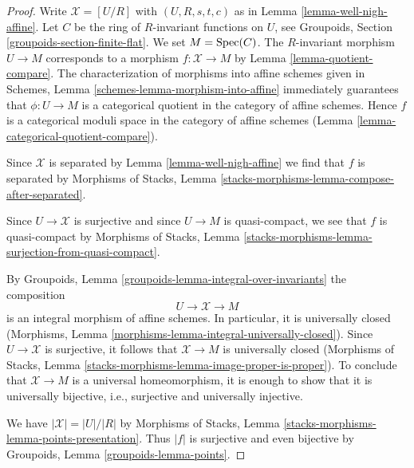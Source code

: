\begin{proof}
Write $\mathcal{X} = [U/R]$ with $(U, R, s, t, c)$ as in
Lemma \ref{lemma-well-nigh-affine}. Let $C$ be the ring of
$R$-invariant functions on $U$, see
Groupoids, Section \ref{groupoids-section-finite-flat}.
We set $M = \mathop{\mathrm{Spec}}(C)$. The $R$-invariant morphism
$U \to M$ corresponds to a morphism $f : \mathcal{X} \to M$ by
Lemma \ref{lemma-quotient-compare}.
The characterization of morphisms into affine schemes given in
Schemes, Lemma \ref{schemes-lemma-morphism-into-affine}
immediately guarantees that $\phi : U \to M$ is a categorical
quotient in the category of affine schemes. Hence $f$ is a
categorical moduli space in the category of affine schemes
(Lemma \ref{lemma-categorical-quotient-compare}).

\medskip\noindent
Since $\mathcal{X}$ is separated by Lemma \ref{lemma-well-nigh-affine}
we find that $f$ is separated by Morphisms of Stacks, Lemma
\ref{stacks-morphisms-lemma-compose-after-separated}.

\medskip\noindent
Since $U \to \mathcal{X}$ is surjective and since $U \to M$ is quasi-compact,
we see that $f$ is quasi-compact by Morphisms of Stacks, Lemma
\ref{stacks-morphisms-lemma-surjection-from-quasi-compact}.

\medskip\noindent
By Groupoids, Lemma \ref{groupoids-lemma-integral-over-invariants}
the composition
$$
U \to \mathcal{X} \to M
$$
is an integral morphism of affine schemes. In particular, it is
universally closed
(Morphisms, Lemma \ref{morphisms-lemma-integral-universally-closed}).
Since $U \to \mathcal{X}$ is surjective, it follows that $\mathcal{X} \to M$
is universally closed (Morphisms of Stacks, Lemma
\ref{stacks-morphisms-lemma-image-proper-is-proper}).
To conclude that $\mathcal{X} \to M$ is a universal homeomorphism,
it is enough to show that it is universally bijective, i.e.,
surjective and universally injective.

\medskip\noindent
We have $|\mathcal{X}| = |U|/|R|$ by
Morphisms of Stacks, Lemma \ref{stacks-morphisms-lemma-points-presentation}.
Thus $|f|$ is surjective and even bijective
by Groupoids, Lemma \ref{groupoids-lemma-points}.


\end{proof}
